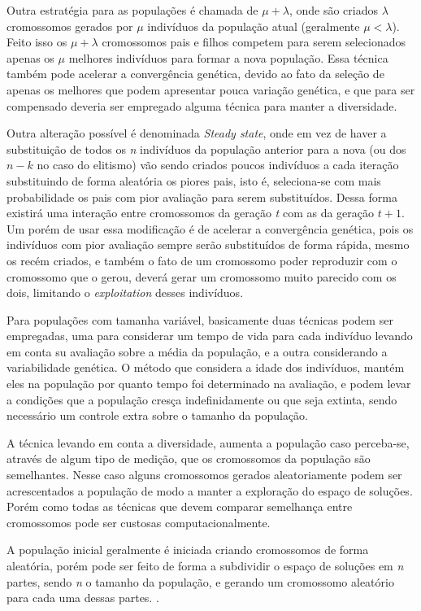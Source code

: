 Outra estratégia para as populações é chamada de \(\mu + \lambda\), onde são criados \(\lambda\) cromossomos gerados por \(\mu\) indivíduos da população atual (geralmente \(\mu < \lambda\)). Feito isso os \(\mu + \lambda\) cromossomos pais e filhos competem para serem selecionados apenas os \(\mu\) melhores indivíduos para formar a nova população. Essa técnica também pode acelerar a convergência genética, devido ao fato da seleção de apenas os melhores que podem apresentar pouca variação genética, e que para ser compensado deveria ser empregado alguma técnica para manter a diversidade.

Outra alteração possível é denominada \textit{Steady state}, onde em vez de haver a substituição de todos os \textit{n} indivíduos da população anterior para a nova (ou dos \(n - k\) no caso do elitismo) vão sendo criados poucos indivíduos a cada iteração substituindo de forma aleatória os piores pais, isto é, seleciona-se com mais probabilidade os pais com pior avaliação para serem substituídos. Dessa forma existirá uma interação entre cromossomos da geração \textit{t} com as da geração \(t+1\). Um porém de usar essa modificação é de acelerar a convergência genética, pois os indivíduos com pior avaliação sempre serão substituídos de forma rápida, mesmo os recém criados, e também o fato de um cromossomo poder reproduzir com o cromossomo que o gerou, deverá gerar um cromossomo muito parecido com os dois, limitando o \textit{exploitation} desses indivíduos.

Para populações com tamanha variável, basicamente duas técnicas podem ser empregadas, uma para considerar um tempo de vida para cada indivíduo levando em conta su avaliação sobre a média da população, e a outra considerando a variabilidade genética. O método que considera a idade dos indivíduos, mantém eles na população por quanto tempo foi determinado na avaliação, e podem levar a condições que a população cresça indefinidamente ou que seja extinta, sendo necessário um controle extra sobre o tamanho da população.

A técnica levando em conta a diversidade, aumenta a população caso perceba-se, através de algum tipo de medição, que os cromossomos da população são semelhantes. Nesse caso alguns cromossomos gerados aleatoriamente podem ser acrescentados a população de modo a manter a exploração do espaço de soluções. Porém como todas as técnicas que devem comparar semelhança entre cromossomos pode ser custosas computacionalmente.

A população inicial geralmente é iniciada criando cromossomos de forma aleatória, porém pode ser feito de forma a subdividir o espaço de soluções em \textit{n} partes, sendo \textit{n} o tamanho da população, e gerando um cromossomo aleatório para cada uma dessas partes. \cite{Linden2008}.

